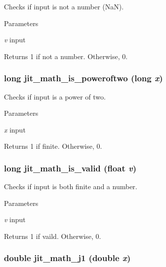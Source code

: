 Checks if input is not a number (NaN). 
\begin{DoxyParams}{Parameters}
\item[{\em v}]input \end{DoxyParams}
\begin{DoxyReturn}{Returns}
1 if not a number. Otherwise, 0. 
\end{DoxyReturn}
\hypertarget{group__mathmod_ga663f468e3ac91ed951580471e44c9538}{
\subsubsection[{jit\_\-math\_\-is\_\-poweroftwo}]{\setlength{\rightskip}{0pt plus 5cm}long jit\_\-math\_\-is\_\-poweroftwo (long {\em x})}}
\label{group__mathmod_ga663f468e3ac91ed951580471e44c9538}


Checks if input is a power of two. 
\begin{DoxyParams}{Parameters}
\item[{\em x}]input \end{DoxyParams}
\begin{DoxyReturn}{Returns}
1 if finite. Otherwise, 0. 
\end{DoxyReturn}
\hypertarget{group__mathmod_ga1946e8fd8d835c84668fcd24ab1cf518}{
\subsubsection[{jit\_\-math\_\-is\_\-valid}]{\setlength{\rightskip}{0pt plus 5cm}long jit\_\-math\_\-is\_\-valid (float {\em v})}}
\label{group__mathmod_ga1946e8fd8d835c84668fcd24ab1cf518}


Checks if input is both finite and a number. 
\begin{DoxyParams}{Parameters}
\item[{\em v}]input \end{DoxyParams}
\begin{DoxyReturn}{Returns}
1 if vaild. Otherwise, 0. 
\end{DoxyReturn}
\hypertarget{group__mathmod_ga29954144d25b2c4793fd1a78d8bff5e8}{
\subsubsection[{jit\_\-math\_\-j1}]{\setlength{\rightskip}{0pt plus 5cm}double jit\_\-math\_\-j1 (double {\em x})}}
\label{group__mathmod_ga29954144d25b2c4793fd1a78d8bff5e8}


